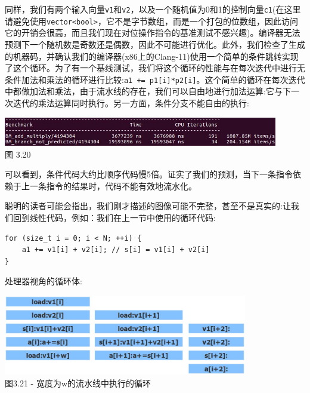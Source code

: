 同样，我们有两个输入向量\texttt{v1}和\texttt{v2}，以及一个随机值为0和1的控制向量\texttt{c1}(在这里请避免使用\texttt{vector<bool>}，它不是字节数组，而是一个打包的位数组，因此访问它的开销会很高，而且我们现在对位操作指令的基准测试不感兴趣)。编译器无法预测下一个随机数是奇数还是偶数，因此不可能进行优化。此外，我们检查了生成的机器码，并确认我们的编译器(x86上的Clang-11)使用一个简单的条件跳转实现了这个循环。为了有一个基线测试，我们将这个循环的性能与在每次迭代中进行无条件加法和乘法的循环进行比较:\texttt{a1 += p1[i]*p2[i]}。这个简单的循环在每次迭代中都做加法和乘法，由于流水线的存在，我们可以自由地进行加法运算:它与下一次迭代的乘法运算同时执行。另一方面，条件分支不能自由的执行:

\begin{center}
\includegraphics[width=0.9\textwidth]{content/1/chapter3/images/20.jpg}\\
图 3.20
\end{center}

可以看到，条件代码大约比顺序代码慢5倍。证实了我们的预测，当下一条指令依赖于上一条指令的结果时，代码不能有效地流水化。



聪明的读者可能会指出，我们刚才描述的图像可能不完整，甚至不是真实的:让我们回到线性代码，例如：我们在上一节中使用的循环代码:

\begin{lstlisting}[style=styleCXX]
for (size_t i = 0; i < N; ++i) {
	a1 += v1[i] + v2[i]; // s[i] = v1[i] + v2[i]
}
\end{lstlisting}

处理器视角的循环体:

\begin{center}
\includegraphics[width=0.8\textwidth]{content/1/chapter3/images/21.jpg}\\
图3.21 - 宽度为w的流水线中执行的循环
\end{center}

